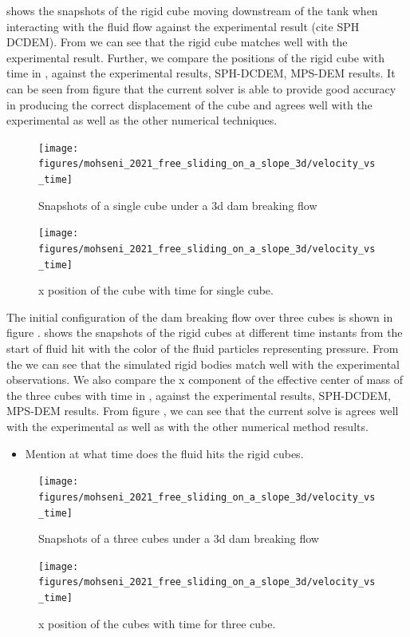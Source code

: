 \documentclass[preprint,12pt]{elsarticle}
\begin{document}
 shows the snapshots of
the rigid cube moving downstream of the tank when interacting with the fluid
flow against the experimental result (cite SPH DCDEM). From
 we can see that the
rigid cube matches well with the experimental result. Further, we compare the
positions of the rigid cube with time in
, against the
experimental results, SPH-DCDEM, MPS-DEM results. It can be seen from figure
 that the current solver
is able to provide good accuracy in producing the correct displacement of the
cube and agrees well with the experimental as well as the other numerical
techniques.
\begin{figure}[!htpb]
  \centering
  \texttt{[image: figures/mohseni\_2021\_free\_sliding\_on\_a\_slope\_3d/velocity\_vs\_time]}
  \caption{Snapshots of a single cube under a 3d dam breaking flow}
\label{fig:snapshots-single-cube-3d-dam-breaking-flow}
\end{figure}
\begin{figure}[!htpb]
  \centering
  \texttt{[image: figures/mohseni\_2021\_free\_sliding\_on\_a\_slope\_3d/velocity\_vs\_time]}
  \caption{x position of the cube with time for single cube.}
\label{fig:x-position-single-cube-3d-dam-breaking-flow}
\end{figure}

The initial configuration of the dam breaking flow over three cubes is shown
in figure .
 shows the snapshots of
the rigid cubes at different time instants from the start of fluid hit with
the color of the fluid particles representing pressure. From the
 we can see that the
simulated rigid bodies match well with the experimental observations. We also
compare the x component of the effective center of mass of the three cubes
with time in , against
the experimental results, SPH-DCDEM, MPS-DEM results. From figure
, we can see that the
current solve is agrees well with the experimental as well as with the other
numerical method results.
\begin{itemize}
\item Mention at what time does the fluid hits the rigid cubes.
\end{itemize}
\begin{figure}[!htpb]
  \centering
  \texttt{[image: figures/mohseni\_2021\_free\_sliding\_on\_a\_slope\_3d/velocity\_vs\_time]}
  \caption{Snapshots of a three cubes under a 3d dam breaking flow}
\label{fig:snapshots-three-cubes-3d-dam-breaking-flow}
\end{figure}
\begin{figure}[!htpb]
  \centering
  \texttt{[image: figures/mohseni\_2021\_free\_sliding\_on\_a\_slope\_3d/velocity\_vs\_time]}
  \caption{x position of the cubes with time for three cube.}
\label{fig:x-position-three-cubes-3d-dam-breaking-flow}
\end{figure}
\end{document}
